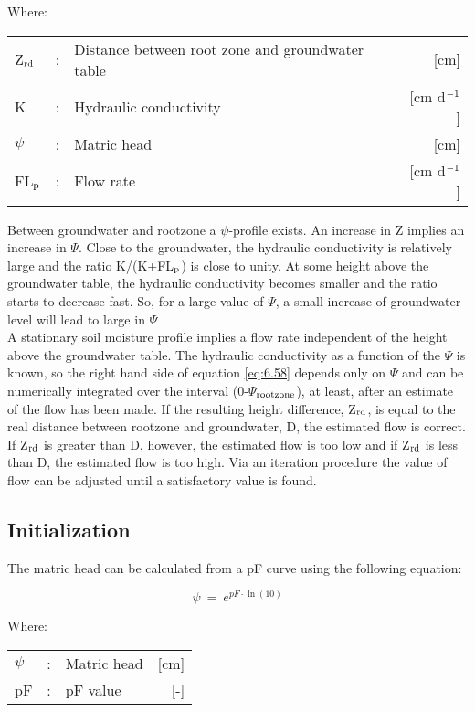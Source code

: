 Where:\\[5pt]
\begin{tabularx}{\textwidth}{llXr}
Z$_{{\rm rd}}$ &:& Distance between root zone and groundwater table  & [cm]\\
K &:& Hydraulic conductivity  & [cm d$^{{\rm -1}}$]\\
$\psi$ &:& Matric head  & [cm]\\
FL$_{{\rm p}}$ &:& Flow rate  & [cm d$^{{\rm -1}}$]\\
\end{tabularx}

Between groundwater and rootzone a $\psi$-profile exists. An increase in Z implies an
increase in $\Psi$. Close to the groundwater, the hydraulic conductivity is relatively large and
the ratio K/(K+FL$_{{\rm p}}$) is close to unity. At some height above the groundwater table, the
hydraulic conductivity becomes smaller and the ratio starts to decrease fast. So, for a
large value of $\Psi$, a small increase of groundwater level will lead to large in $\Psi$\\
A stationary soil moisture profile implies a flow rate independent of the height above the
groundwater table. The hydraulic conductivity as a function of the $\Psi$ is known, so the
right hand side of equation \ref{eq:6.58} depends only on $\Psi$ and can be numerically integrated
over the interval (0-$\Psi$$_{{\rm rootzone}}$), at least, after an estimate of the flow has been made. If the
resulting height difference, Z$_{{\rm rd}}$, is equal to the real distance between rootzone and
groundwater, D, the estimated flow is correct. If Z$_{{\rm rd}}$ is greater than D, however, the
estimated flow is too low and if Z$_{{\rm rd}}$ is less than D, the estimated flow is too high. Via an
iteration procedure the value of flow can be adjusted until a satisfactory value is found.

\subsection{Initialization}
The matric head can be calculated from a pF curve using the following equation:

\begin{equation}
\label{eq:6.59}
\psi ~=~e ^{pF \cdot \ln(10)} 
\end{equation}

Where:\\[5pt]
\begin{tabularx}{\textwidth}{llXr}
$\psi$ &:& Matric head  & [cm]\\
pF &:& pF value  & [-]\\
\end{tabularx}

